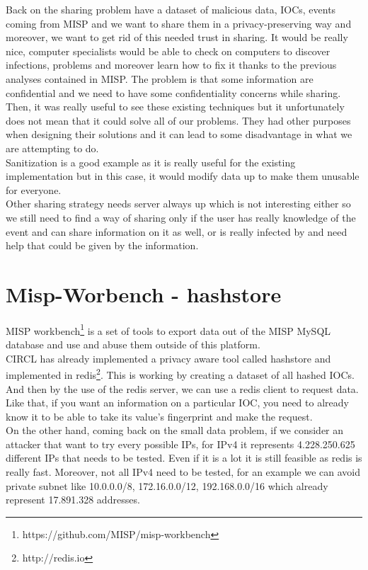 \documentclass{eplmastersthesis}
\begin{document}
Back on the sharing problem have a dataset of malicious data, IOCs, events coming from MISP and we want to share them in a privacy-preserving way and moreover, we want to get rid of this needed trust in sharing.
It would be really nice, computer specialists would be able to check on computers to discover infections, problems and moreover learn how to fix it thanks to the previous analyses contained in MISP. The problem is that some information are confidential and we need to have some confidentiality concerns while sharing. \\


Then, it was really useful to see these existing techniques but it unfortunately does not mean that it could solve all of our problems. They had other purposes when designing their solutions and it can lead to some disadvantage in what we are attempting to do.\\
Sanitization is a good example as it is really useful for the existing implementation but in this case, it would modify data up to make them unusable for everyone.\\
Other sharing strategy needs server always up which is not interesting either so we still need to find a way of sharing only if the user has really knowledge of the event and can share information on it as well, or is really infected by and need help that could be given by the information.\\


\section{Misp-Worbench - hashstore}

MISP workbench\footnote{https://github.com/MISP/misp-workbench} is a set of tools to export data out of the MISP MySQL database and use and abuse them outside of this platform.\\

CIRCL has already implemented a privacy aware tool called hashstore and implemented in redis\footnote{http://redis.io}. This is working by creating a dataset of all hashed IOCs. And then by the use of the redis server, we can use a redis client to request data.\\
Like that, if you want an information on a particular IOC, you need to already know it to be able to take its value's fingerprint and make the request.\\
On the other hand, coming back on the small data problem, if we consider an attacker that want to try every possible IPs, for IPv4 it represents 4.228.250.625 different IPs that needs to be tested. Even if it is a lot it is still feasible as redis is really fast. Moreover, not all IPv4 need to be tested, for an example we can avoid private subnet like 10.0.0.0/8, 172.16.0.0/12, 192.168.0.0/16 which already represent 17.891.328 addresses.
\end{document}

